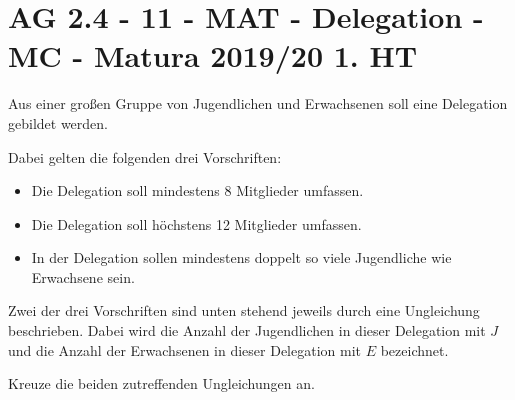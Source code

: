 \section{AG 2.4 - 11 - MAT - Delegation - MC - Matura 2019/20 1. HT}

\begin{beispiel}[AG 2.4]{1}
Aus einer großen Gruppe von Jugendlichen und Erwachsenen soll eine Delegation gebildet werden.

Dabei gelten die folgenden drei Vorschriften:
\begin{itemize}
\item Die Delegation soll mindestens 8 Mitglieder umfassen.
\item Die Delegation soll höchstens 12 Mitglieder umfassen.
\item In der Delegation sollen mindestens doppelt so viele Jugendliche wie Erwachsene sein.
\end{itemize}

Zwei der drei Vorschriften sind unten stehend jeweils durch eine Ungleichung beschrieben. Dabei wird die Anzahl der Jugendlichen in dieser Delegation mit $J$ und die Anzahl der Erwachsenen in dieser Delegation mit $E$ bezeichnet.

Kreuze die beiden zutreffenden Ungleichungen an.

\end{beispiel}